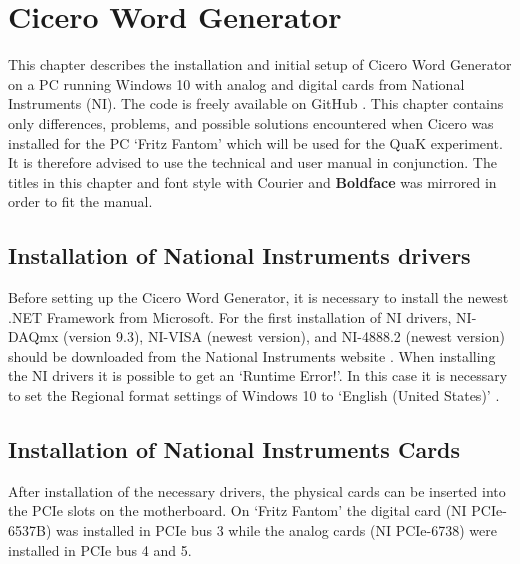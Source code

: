 
\chapter{Cicero Word Generator}\label{chap:Cicero, Cicero Word Generator}
This chapter describes the installation and initial setup of Cicero Word Generator \autocite{keshet2013distributed} on a PC running Windows 10 with analog and digital cards from National Instruments (NI). The code is freely available on GitHub \autocite{akeshet:Github}. This chapter contains only differences, problems, and possible solutions encountered when Cicero was installed for the PC `Fritz Fantom' which will be used for the QuaK experiment. It is therefore advised to use the technical and user manual \autocite{akeshet:manual} in conjunction. The titles in this chapter and font style with {\selectfont Courier} and \textbf{Boldface} was mirrored in order to fit the manual.

\section{Installation of National Instruments drivers}\label{sec:Cicero, Installation of National Instruments drivers}
Before setting up the Cicero Word Generator, it is necessary to install the newest .NET Framework \autocite{microsoft:download.net} from Microsoft. For the first installation of NI drivers, NI-DAQmx (version 9.3), NI-VISA (newest version), and NI-4888.2 (newest version) should be downloaded from the National Instruments website \autocite{ni:drivers}. When installing the NI drivers it is possible to get an `Runtime Error!'. In this case it is necessary to set the Regional format settings of Windows 10 to `English (United States)' \autocite{ni:runtimeerror}.

\section{Installation of National Instruments Cards}\label{sec:Cicero, Installation of National Instruments Cards}
After installation of the necessary drivers, the physical cards can be inserted into the PCIe slots on the motherboard. On `Fritz Fantom' the digital card (NI PCIe-6537B) was installed in PCIe bus 3 while the analog cards (NI PCIe-6738) were installed in PCIe bus 4 and 5.

